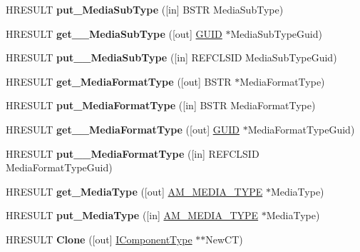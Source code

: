 \begin{DoxyCompactItemize}
H\+R\+E\+S\+U\+LT {\bfseries put\+\_\+\+Media\+Sub\+Type} (\mbox{[}in\mbox{]} B\+S\+TR Media\+Sub\+Type)
\item 
\mbox{\label{interface_i_component_type_a780e625c8b8ca7f02dfacfb87ff2b8dc}} 
H\+R\+E\+S\+U\+LT {\bfseries get\+\_\+\+\_\+\+Media\+Sub\+Type} (\mbox{[}out\mbox{]} \hyperlink{interface_g_u_i_d}{G\+U\+ID} $\ast$Media\+Sub\+Type\+Guid)
\item 
\mbox{\label{interface_i_component_type_a61753d11858e7d9d80cb884c2eab59eb}} 
H\+R\+E\+S\+U\+LT {\bfseries put\+\_\+\+\_\+\+Media\+Sub\+Type} (\mbox{[}in\mbox{]} R\+E\+F\+C\+L\+S\+ID Media\+Sub\+Type\+Guid)
\item 
\mbox{\label{interface_i_component_type_a34e9988dc2f253792c2aa2fd1fe8cb7a}} 
H\+R\+E\+S\+U\+LT {\bfseries get\+\_\+\+Media\+Format\+Type} (\mbox{[}out\mbox{]} B\+S\+TR $\ast$Media\+Format\+Type)
\item 
\mbox{\label{interface_i_component_type_a2f94c072d9d897caeb4898d0be59c043}} 
H\+R\+E\+S\+U\+LT {\bfseries put\+\_\+\+Media\+Format\+Type} (\mbox{[}in\mbox{]} B\+S\+TR Media\+Format\+Type)
\item 
\mbox{\label{interface_i_component_type_a7c31016b7a572af585d6e283014454ea}} 
H\+R\+E\+S\+U\+LT {\bfseries get\+\_\+\+\_\+\+Media\+Format\+Type} (\mbox{[}out\mbox{]} \hyperlink{interface_g_u_i_d}{G\+U\+ID} $\ast$Media\+Format\+Type\+Guid)
\item 
\mbox{\label{interface_i_component_type_a88a7d5176568e638a1f7b21bc24f40ad}} 
H\+R\+E\+S\+U\+LT {\bfseries put\+\_\+\+\_\+\+Media\+Format\+Type} (\mbox{[}in\mbox{]} R\+E\+F\+C\+L\+S\+ID Media\+Format\+Type\+Guid)
\item 
\mbox{\label{interface_i_component_type_a362ff24952e285df6303da268f8add08}} 
H\+R\+E\+S\+U\+LT {\bfseries get\+\_\+\+Media\+Type} (\mbox{[}out\mbox{]} \hyperlink{struct_a_m___m_e_d_i_a___t_y_p_e}{A\+M\+\_\+\+M\+E\+D\+I\+A\+\_\+\+T\+Y\+PE} $\ast$Media\+Type)
\item 
\mbox{\label{interface_i_component_type_af0f01f26eaf00d755f2702e2203e4477}} 
H\+R\+E\+S\+U\+LT {\bfseries put\+\_\+\+Media\+Type} (\mbox{[}in\mbox{]} \hyperlink{struct_a_m___m_e_d_i_a___t_y_p_e}{A\+M\+\_\+\+M\+E\+D\+I\+A\+\_\+\+T\+Y\+PE} $\ast$Media\+Type)
\item 
\mbox{\label{interface_i_component_type_a52120a3ab13a8f97b377a208c6035f49}} 
H\+R\+E\+S\+U\+LT {\bfseries Clone} (\mbox{[}out\mbox{]} \hyperlink{interface_i_component_type}{I\+Component\+Type} $\ast$$\ast$New\+CT)
\end{DoxyCompactItemize}
